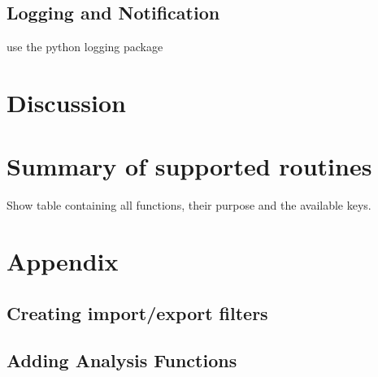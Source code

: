 \subsection{Logging and Notification}\label{logging}

use the python logging package

\section{Discussion}


\section{Summary of supported routines}

Show table containing all functions, their purpose and the available keys.

\section{Appendix}

\subsection{Creating import/export filters}

\subsection{Adding Analysis Functions}


